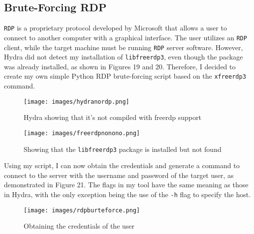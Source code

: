 \documentclass[a4paper]{article}
\newcommand{\abc}{\hfill \break}
\begin{document}
\subsection{Brute-Forcing RDP}
\texttt{RDP} is a proprietary protocol developed by Microsoft that allows a user to connect to another computer with a graphical interface. The user utilizes an \texttt{RDP} client, while the target machine must be running \texttt{RDP} server software. \cite{noauthor_remote_2024}\abc
However, Hydra did not detect my installation of \texttt{libfreerdp3}, even though the package was already installed, as shown in Figures 19 and 20. Therefore, I decided to create my own simple Python RDP brute-forcing script based on the \texttt{xfreerdp3} command.
\begin{figure}[h]
	\texttt{[image: images/hydranordp.png]}
	\centering
	\caption{Hydra showing that it's not compiled with freerdp support}
\end{figure}\abc
\begin{figure}[h]
	\texttt{[image: images/freerdpnonono.png]}
	\centering
	\caption{Showing that the \texttt{libfreerdp3} package is installed but not found}
\end{figure}\abc
Using my script, I can now obtain the credentials and generate a command to connect to the server with the username and password of the target user, as demonstrated in Figure 21. The flags in my tool have the same meaning as those in Hydra, with the only exception being the use of the \texttt{-h} flag to specify the host.
\begin{figure}[h]
	\texttt{[image: images/rdpburteforce.png]}
	\centering
	\caption{Obtaining the credentials of the user}
\end{figure}\abc \newpage
\end{document}
